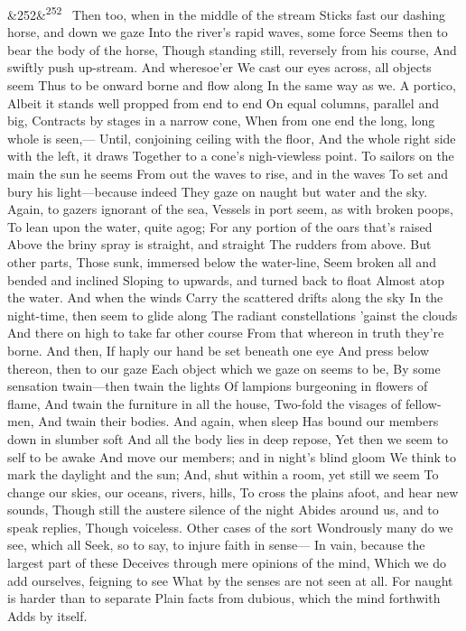 \documentclass[12pt]{article}
\newcommand{\para}[1][]{\par\noindent\ifx&#1&\else\textsuperscript{\footnotesize #1}~\fi}
\begin{document}
\para[252] Then too, when in the middle of the stream Sticks fast our dashing horse, and down we gaze Into the river's rapid waves, some force Seems then to bear the body of the horse, Though standing still, reversely from his course, And swiftly push up-stream. And wheresoe'er We cast our eyes across, all objects seem Thus to be onward borne and flow along In the same way as we. A portico, Albeit it stands well propped from end to end On equal columns, parallel and big, Contracts by stages in a narrow cone, When from one end the long, long whole is seen,--- Until, conjoining ceiling with the floor, And the whole right side with the left, it draws Together to a cone's nigh-viewless point. To sailors on the main the sun he seems From out the waves to rise, and in the waves To set and bury his light---because indeed They gaze on naught but water and the sky. Again, to gazers ignorant of the sea, Vessels in port seem, as with broken poops, To lean upon the water, quite agog; For any portion of the oars that's raised Above the briny spray is straight, and straight The rudders from above. But other parts, Those sunk, immersed below the water-line, Seem broken all and bended and inclined Sloping to upwards, and turned back to float Almost atop the water. And when the winds Carry the scattered drifts along the sky In the night-time, then seem to glide along The radiant constellations 'gainst the clouds And there on high to take far other course From that whereon in truth they're borne. And then, If haply our hand be set beneath one eye And press below thereon, then to our gaze Each object which we gaze on seems to be, By some sensation twain---then twain the lights Of lampions burgeoning in flowers of flame, And twain the furniture in all the house, Two-fold the visages of fellow-men, And twain their bodies. And again, when sleep Has bound our members down in slumber soft And all the body lies in deep repose, Yet then we seem to self to be awake And move our members; and in night's blind gloom We think to mark the daylight and the sun; And, shut within a room, yet still we seem To change our skies, our oceans, rivers, hills, To cross the plains afoot, and hear new sounds, Though still the austere silence of the night Abides around us, and to speak replies, Though voiceless. Other cases of the sort Wondrously many do we see, which all Seek, so to say, to injure faith in sense--- In vain, because the largest part of these Deceives through mere opinions of the mind, Which we do add ourselves, feigning to see What by the senses are not seen at all. For naught is harder than to separate Plain facts from dubious, which the mind forthwith Adds by itself.
\end{document}
